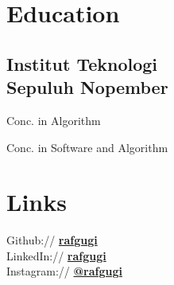\documentclass[letterpaper]{deedy-resume} %
\begin{document}

\lastupdated


\begin{minipage}[t]{0.33\textwidth} %


\section{Education} 

\subsection[ITS]{Institut Teknologi\\Sepuluh Nopember}

Conc. in Algorithm \\
\sectionspace

Conc. in Software and Algorithm \\
\sectionspace


\section{Links} 

Github:// \href{https://github.com/rafgugi}{\bf rafgugi} \\
LinkedIn:// \href{https://www.linkedin.com/in/rafgugi}{\bf rafgugi} \\
Instagram:// \href{https://instagram.com/rafgugi}{\bf @rafgugi} \\
\sectionspace


\end{minipage}
\end{document}
